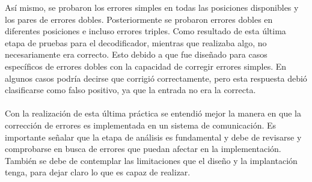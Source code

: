 \documentclass[12pt,letterpaper]{article}
\begin{document}
Así mismo, se probaron los errores simples en todas las posiciones disponibles y los pares de 
errores dobles. Posteriormente se probaron errores dobles en diferentes posiciones e incluso errores 
triples. Como resultado de esta última etapa de pruebas para el decodificador, mientras que realizaba 
algo, no necesariamente era correcto. Esto debido a que fue diseñado para casos específicos de errores 
dobles con la capacidad de corregir errores simples. En algunos casos podría decirse que corrigió 
correctamente, pero esta respuesta debió clasificarse como falso positivo, ya que la entrada no era 
la correcta.
\\ \\
Con la realización de esta última práctica se entendió mejor la manera en que la corrección 
de errores es implementada en un sistema de comunicación. Es importante señalar que la etapa de 
análisis es fundamental y debe de revisarse y comprobarse en busca de errores que puedan afectar 
en la implementación. También se debe de contemplar las limitaciones que el diseño y la implantación 
tenga, para dejar claro lo que es capaz de realizar.
\end{document}
